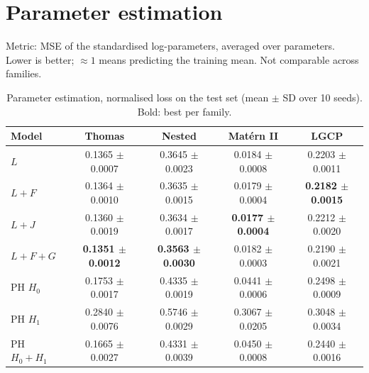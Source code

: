 \documentclass[10pt,a4paper]{article}
\newcommand{\B}[1]{\textbf{#1}}
\begin{document}
\section{Parameter estimation}

Metric: MSE of the standardised log-parameters, averaged over parameters. Lower is better; $\approx 1$ means predicting the training mean. Not comparable across families.

\begin{table}[H]
\centering\small
\begin{tabular}{@{}l cccc@{}}
\toprule
Model & Thomas & Nested & Mat\'ern II & LGCP\\
\midrule
$L$ & 0.1365 $\pm$ 0.0007 & 0.3645 $\pm$ 0.0023 & 0.0184 $\pm$ 0.0008 & 0.2203 $\pm$ 0.0011\\
$L{+}F$ & 0.1364 $\pm$ 0.0010 & 0.3635 $\pm$ 0.0015 & 0.0179 $\pm$ 0.0004 & \B{0.2182 $\pm$ 0.0015}\\
$L{+}J$ & 0.1360 $\pm$ 0.0019 & 0.3634 $\pm$ 0.0017 & \B{0.0177 $\pm$ 0.0004} & 0.2212 $\pm$ 0.0020\\
$L{+}F{+}G$ & \B{0.1351 $\pm$ 0.0012} & \B{0.3563 $\pm$ 0.0030} & 0.0182 $\pm$ 0.0003 & 0.2190 $\pm$ 0.0021\\
\midrule
PH $H_0$ & 0.1753 $\pm$ 0.0017 & 0.4335 $\pm$ 0.0019 & 0.0441 $\pm$ 0.0006 & 0.2498 $\pm$ 0.0009\\
PH $H_1$ & 0.2840 $\pm$ 0.0076 & 0.5746 $\pm$ 0.0029 & 0.3067 $\pm$ 0.0205 & 0.3048 $\pm$ 0.0034\\
PH $H_0{+}H_1$ & 0.1665 $\pm$ 0.0027 & 0.4331 $\pm$ 0.0039 & 0.0450 $\pm$ 0.0008 & 0.2440 $\pm$ 0.0016\\
\bottomrule
\end{tabular}
\caption{Parameter estimation, normalised loss on the test set (mean $\pm$ SD over 10 seeds). Bold: best per family.}
\label{tab:params}
\end{table}
\end{document}
